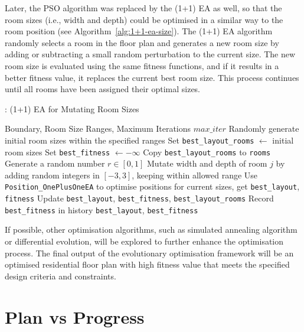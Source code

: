 \documentclass[]{article}
\begin{document}
Later, the PSO algorithm was replaced by the (1+1) EA as well, so that the room sizes (i.e., width and depth) could be optimised in a similar way to the room position (see Algorithm~\ref{alg:1+1-ea-size}). The (1+1) EA algorithm randomly selects a room in the floor plan and generates a new room size by adding or subtracting a small random perturbation to the current size. The new room size is evaluated using the same fitness functions, and if it results in a better fitness value, it replaces the current best room size. This process continues until all rooms have been assigned their optimal sizes.
\begin{algorithm}[H]
    \caption{: (1+1) EA for Mutating Room Sizes}
    \label{alg:1+1-ea-size}
    \begin{algorithmic}[1]
        \REQUIRE Boundary, Room Size Ranges, Maximum Iterations $max\_iter$
        \STATE Randomly generate initial room sizes within the specified ranges
        \STATE Set \texttt{best\_layout\_rooms} $\gets$ initial room sizes
        \STATE Set \texttt{best\_fitness} $\gets -\infty$
        \STATE Copy \texttt{best\_layout\_rooms} to \texttt{rooms}
        \STATE Generate a random number $r \in [0,1]$
        \STATE Mutate width and depth of room $j$ by adding random integers in $[-3, 3]$, keeping within allowed range
        \ENDIF
        \ENDFOR
        \STATE Use \texttt{Position\_OnePlusOneEA} to optimise positions for current sizes, get \texttt{best\_layout}, \texttt{fitness}
        \STATE Update \texttt{best\_layout}, \texttt{best\_fitness}, \texttt{best\_layout\_rooms}
        \ENDIF
        \STATE Record \texttt{best\_fitness} in history
        \ENDFOR
        \RETURN \texttt{best\_layout}, \texttt{best\_fitness}
    \end{algorithmic}
\end{algorithm}

If possible, other optimisation algorithms, such as simulated annealing algorithm or differential evolution, will be explored to further enhance the optimisation process. The final output of the evolutionary optimisation framework will be an optimised residential floor plan with high fitness value that meets the specified design criteria and constraints.


\section{Plan vs Progress}
\end{document}
